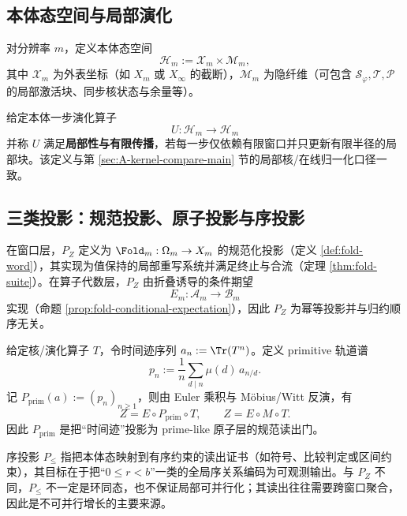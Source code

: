 \subsection{本体态空间与局部演化}\label{subsec:pom-state-evolution}


\begin{definition}[分辨率态空间]\label{def:pom-state-space}
对分辨率 $m$，定义本体态空间
\[
\mathcal{H}_m:=\mathcal{X}_m\times \mathcal{M}_m,
\]
其中 $\mathcal{X}_m$ 为外表坐标（如 $X_m$ 或 $X_\infty$ 的截断），$\mathcal{M}_m$ 为隐纤维（可包含 $\mathcal{S}_\varphi,\mathcal{T},\mathcal{P}$ 的局部激活块、同步核状态与余量等）。
\end{definition}

\begin{definition}[局部性与有限传播]\label{def:pom-locality}
给定本体一步演化算子
\[
U:\mathcal{H}_m\to\mathcal{H}_m
\]
并称 \(U\) 满足\textbf{局部性与有限传播}，若每一步仅依赖有限窗口并只更新有限半径的局部块。该定义与第 \ref{sec:A-kernel-compare-main} 节的局部核/在线归一化口径一致。
\end{definition}

\subsection{三类投影：规范投影、原子投影与序投影}\label{subsec:pom-projections}
\begin{definition}[规范投影 $P_Z$]\label{def:pom-proj-norm}
在窗口层，$P_Z$ 定义为 $\Fold_m:\Omega_m\to X_m$ 的规范化投影（定义 \ref{def:fold-word}），其实现为值保持的局部重写系统并满足终止与合流（定理 \ref{thm:fold-suite}）。在算子代数层，$P_Z$ 由折叠诱导的条件期望
\[
E_m:\mathcal{A}_m\to\mathcal{B}_m
\]
实现（命题 \ref{prop:fold-conditional-expectation}），因此 $P_Z$ 为幂等投影并与归约顺序无关。
\end{definition}

\begin{definition}\label{def:pom-proj-prim}
给定核/演化算子 $T$，令时间迹序列 $a_n:=\Tr(T^n)$。定义 primitive 轨道谱
\[
p_n:=\frac{1}{n}\sum_{d\mid n}\mu(d)\,a_{n/d}.
\]
记 $P_{\mathrm{prim}}(a):=(p_n)_{n\ge 1}$，则由 Euler 乘积与 Möbius/Witt 反演，有
\[
Z=E\circ P_{\mathrm{prim}}\circ T,
\qquad
Z=E\circ M\circ T.
\]
因此 $P_{\mathrm{prim}}$ 是把“时间迹”投影为 prime-like 原子层的规范读出门。
\end{definition}

\begin{definition}[序投影 $P_{\le}$]\label{def:pom-proj-order}
序投影 $P_{\le}$ 指把本体态映射到有序约束的读出证书（如符号、比较判定或区间约束），其目标在于把“$0\le r<b$”一类的全局序关系编码为可观测输出。与 $P_Z$ 不同，$P_{\le}$ 不一定是环同态，也不保证局部可并行化；其读出往往需要跨窗口聚合，因此是不可并行增长的主要来源。
\end{definition}

